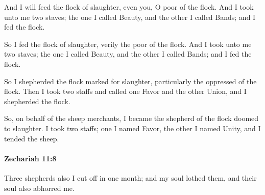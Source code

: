 			And I will feed the flock of slaughter, even you, O poor of the flock. And I took unto me two staves; the one I called Beauty, and the other I called Bands; and I fed the flock.

			\begin{versebox}
					\item[BHS] 
					\item[LXX] 
					\item[ASV] So I fed the flock of slaughter, verily the poor of the flock. And I took unto me two staves; the one I called Beauty, and the other I called Bands; and I fed the flock.
					\item[NIV] So I shepherded the flock marked for slaughter, particularly the oppressed of the flock. Then I took two staffs and called one Favor and the other Union, and I shepherded the flock.
					\item[NRSV] So, on behalf of the sheep merchants, I became the shepherd of the flock doomed to slaughter. I took two staffs; one I named Favor, the other I named Unity, and I tended the sheep.
			\end{versebox}

		\paragraph{Zechariah 11:8} %
			\label{ZECHARIAH-11-8}

			Three shepherds also I cut off in one month; and my soul lothed them, and their soul also abhorred me.


